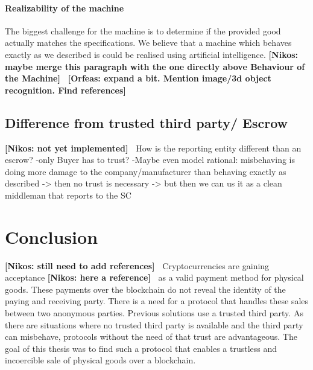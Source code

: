 \documentclass{cacthesis}
\newcommand{\authnote}[3]{{ \footnotesize \textbf{#1[#2: #3]~}}}
\newcommand{\orfnote}[1]{\authnote{\color{blue}}{Orfeas}{#1}}
\newcommand{\niknote}[1]{\authnote{\color{red}}{Nikos}{#1}}
\begin{document}
\subsubsection{Realizability of the machine} 
The biggest challenge for the machine is to determine if the provided good actually matches the specifications.\newline
We believe that a machine which behaves exactly as we described is could be
realised using artificial intelligence. 
\niknote{maybe merge this paragraph with the one directly above Behaviour of the Machine}\orfnote{expand a bit. Mention image/3d
object recognition. Find references}


\section{Difference from trusted third party/ Escrow}
\niknote{not yet implemented}
How is the reporting entity different than an escrow?
-only Buyer has to trust?
-Maybe even model rational: misbehaving is doing more damage to the company/manufacturer than behaving exactly as described -> then no trust is necessary -> but then we can us it as a clean middleman that reports to the SC

\chapter{Conclusion}
\label{cha:conclusion}
\niknote{still need to add references}\newline
Cryptocurrencies are gaining acceptance\niknote{here a reference} as a valid payment method for physical goods. These payments over the blockchain do not reveal the identity of the paying and receiving party. There is a need for a protocol that handles these sales between two anonymous parties. Previous solutions use a trusted third party. As there are situations where no trusted third party is available and the third party can misbehave, protocols without the need of that trust are advantageous. The goal of this thesis was to find such a protocol that enables a trustless and incoercible sale of physical goods over a blockchain.\newline
\end{document}
